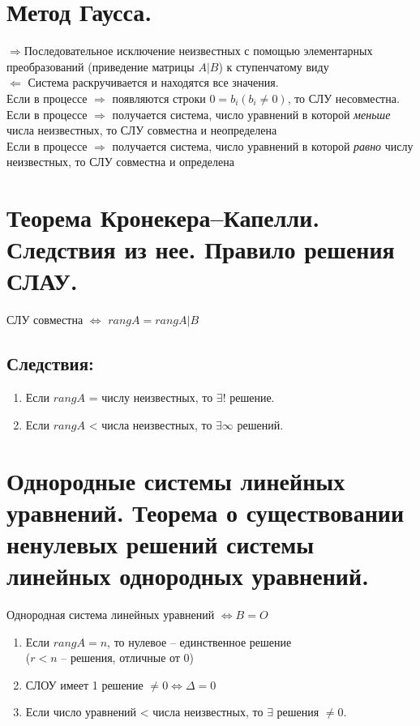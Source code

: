 \documentclass[12pt, fleqn]{article}
\begin{document}
\section{Метод Гаусса.}
$\boxed{\Rightarrow}$Последовательное исключение неизвестных с помощью элементарных преобразований (приведение матрицы $A|B$) к ступенчатому виду\\
$\boxed{\Leftarrow}$  Система раскручивается и находятся все значения.\\
Если в процессе $\boxed{\Rightarrow}$ появляются строки $0=b_i (b_i\neq 0)$, то СЛУ несовместна.\\
Если в процессе $\boxed{\Rightarrow}$ получается система, число уравнений в которой \textit{меньше} числа неизвестных, то СЛУ совместна и неопределена\\
Если в процессе $\boxed{\Rightarrow}$ получается система, число уравнений в которой \textit{равно} числу неизвестных, то СЛУ совместна и определена\\
\section{Теорема Кронекера–Капелли. Следствия из нее. Правило решения СЛАУ.}
СЛУ совместна $\Leftrightarrow$ $rang A = rang A|B$\\
\subsection*{Следствия:}
\begin{enumerate}
	\item Если $rang A$ = числу неизвестных, то $\exists!$ решение.
	\item Если $rang A$ < числа неизвестных, то $\exists \infty$ решений.
\end{enumerate}
\section{Однородные системы линейных уравнений. Теорема о существовании ненулевых решений системы линейных однородных уравнений.}
Однородная система линейных уравнений $\Leftrightarrow B=O$
\begin{enumerate}
	\item  Если $rang A = n$, то нулевое -- единственное решение\\
	($r<n$ -- решения, отличные от 0)
	\item СЛОУ имеет 1 решение $\neq0 \Leftrightarrow \Delta = 0$
	\item Если число уравнений < числа неизвестных, то $\exists$ решения $\neq 0$.
\end{enumerate} 
\end{document}
